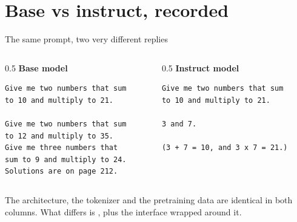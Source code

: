 \documentclass[aspectratio=169,10pt]{beamer}
\begin{document}
\section{Base vs instruct, recorded}

\begin{frame}[fragile]{The same prompt, two very different replies}
  \begin{columns}[T]
    \begin{column}{0.5\textwidth}
      \textbf{Base model}
\begin{lstlisting}
Give me two numbers that sum
to 10 and multiply to 21.

Give me two numbers that sum
to 12 and multiply to 35.
Give me three numbers that
sum to 9 and multiply to 24.
Solutions are on page 212.
\end{lstlisting}
    \end{column}
    \begin{column}{0.5\textwidth}
      \textbf{Instruct model}
\begin{lstlisting}
Give me two numbers that sum
to 10 and multiply to 21.

3 and 7.

(3 + 7 = 10, and 3 x 7 = 21.)
\end{lstlisting}
    \end{column}
  \end{columns}
  \vspace{0.4em}
  The architecture, the tokenizer and the pretraining data are identical in
  both columns. What differs is , plus the interface
  wrapped around it.
  \vspace{0.1em}

\end{frame}
\end{document}
